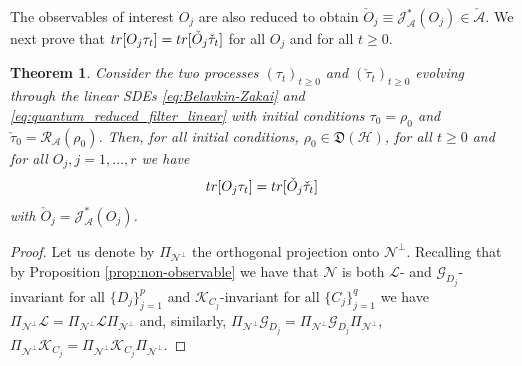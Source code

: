 \documentclass[aihp,12pt]{imsart}
\newcommand{\Gc}{\mathcal{G}}
\newcommand{\Hc}{\mathcal{H}}
\newcommand{\Jc}{\mathcal{J}}
\newcommand{\Rc}{\mathcal{R}}
\newcommand{\Kc}{\mathcal{K}}
\newcommand{\Lc}{\mathcal{L}}
\newcommand{\As}{\mathscr{A}}
\newcommand{\Ns}{\mathscr{N}}
\newcommand{\Df}{\mathfrak{D}}
\newcommand{\tr}{{\rm tr}}
\theoremstyle{theorem}
\newtheorem{theorem}{Theorem}
\theoremstyle{definition}
\theoremstyle{remark}
\begin{document}
The observables of interest $O_j$ are also reduced to obtain 
$\check{O}_j\equiv \Jc_{\As}^*(O_j)\in\check{\As}$. We next prove that $\tr[O_j\tau_t] = \tr[\check{O}_j \check{\tau}_t]$ for all $O_j$ and for all $t\geq0$. 
\begin{theorem}
\label{thm:SDE_reduction}
    Consider the two processes $(\tau_t)_{t\geq0}$ and $(\check{\tau}_t)_{t\geq0}$ evolving through the linear SDEs \eqref{eq:Belavkin-Zakai} and \eqref{eq:quantum_reduced_filter_linear} with initial conditions $\tau_0 = \rho_0$ and $\check{\tau}_0 = \Rc_\As(\rho_0)$. 
    Then, for all initial conditions, $\rho_0\in\Df(\Hc)$, for all $t\geq0$ and for all $O_j, j=1,\ldots,r$ we have $$\tr[O_j\tau_t] = \tr[\check{O}_j \check{\tau}_t]$$ with $\check{O}_j = \Jc_{\As}^*(O_j)$. 
\end{theorem}
\begin{proof}
    Let us denote by $\Pi_{\Ns^\perp}$ the orthogonal projection onto $\Ns^\perp$. 
    Recalling that by Proposition \ref{prop:non-observable} we have that $\Ns$ is both $\Lc$- and $\Gc_{D_j}$-invariant for all $\{D_j\}_{j=1}^p$ and $\Kc_{C_j}$-invariant for all $\{C_j\}_{j=1}^q$ we have $\Pi_{\Ns^\perp}  \Lc  = \Pi_{\Ns^\perp}  \Lc  \Pi_{\Ns^\perp}$ and, similarly, $\Pi_{\Ns^\perp} \Gc_{D_j} = \Pi_{\Ns^\perp}\Gc_{D_j}\Pi_{\Ns^\perp}$, $\Pi_{\Ns^\perp} \Kc_{C_j} = \Pi_{\Ns^\perp}\Kc_{C_j}\Pi_{\Ns^\perp}$. 


\end{proof}
\end{document}
